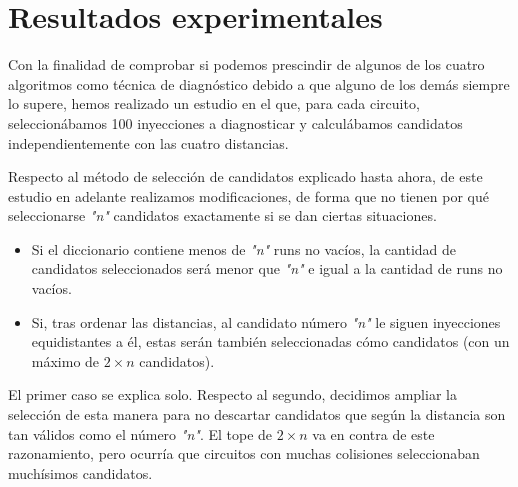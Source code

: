 \section{Resultados experimentales}
\label{sec:4Results}
Con la finalidad de comprobar si podemos prescindir de algunos de los cuatro
algoritmos como técnica de diagnóstico debido a que alguno de los demás siempre lo
supere, hemos realizado un estudio en el que, para cada circuito, seleccionábamos
100 inyecciones a diagnosticar y calculábamos candidatos independientemente con
las cuatro distancias.

Respecto al método de selección de candidatos explicado hasta ahora, de este
estudio en adelante realizamos modificaciones, de forma que no tienen por qué
seleccionarse \textit{"n"} candidatos exactamente si se dan ciertas situaciones.
\begin{itemize}
    \item Si el diccionario contiene menos de \textit{"n"} runs no vacíos, la
        cantidad de candidatos seleccionados será menor que \textit{"n"} e igual
        a la cantidad de runs no vacíos.
    \item Si, tras ordenar las distancias, al candidato número \textit{"n"} le
        siguen inyecciones equidistantes a él, estas serán también seleccionadas
        cómo candidatos (con un máximo de $2 \times n$ candidatos).
\end{itemize}

El primer caso se explica solo. Respecto al segundo, decidimos ampliar la
selección de esta manera para no descartar candidatos que según la distancia son
tan válidos como el número \textit{"n"}. El tope de $2 \times n$ va en contra de
este razonamiento, pero ocurría que circuitos con muchas colisiones seleccionaban
muchísimos candidatos.

